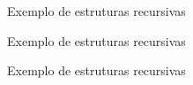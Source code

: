 \begin{frame}[fragile]{Exemplo de estruturas recursivas}
\end{frame}

\begin{frame}[fragile]{Exemplo de estruturas recursivas}
\end{frame}

\begin{frame}[fragile]{Exemplo de estruturas recursivas}
\end{frame}
